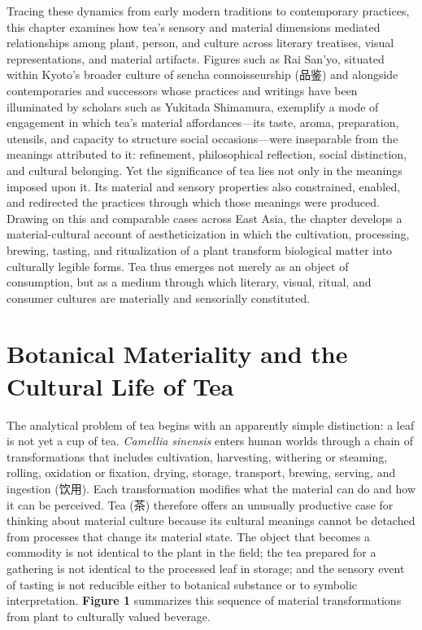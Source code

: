 \documentclass[numbers]{IntechOpen-Book}
\newcommand{\zh}[1]{{\CJKfontspec{Noto Serif CJK SC}\upshape #1}}
\begin{document}
Tracing these dynamics from early modern traditions to contemporary practices, this chapter examines how tea's sensory and material dimensions mediated relationships among plant, person, and culture across literary treatises, visual representations, and material artifacts. Figures such as Rai San'yo, situated within Kyoto's broader culture of sencha connoisseurship (\zh{品鉴}) and alongside contemporaries and successors whose practices and writings have been illuminated by scholars such as Yukitada Shimamura, exemplify a mode of engagement in which tea's material affordances---its taste, aroma, preparation, utensils, and capacity to structure social occasions---were inseparable from the meanings attributed to it: refinement, philosophical reflection, social distinction, and cultural belonging. Yet the significance of tea lies not only in the meanings imposed upon it. Its material and sensory properties also constrained, enabled, and redirected the practices through which those meanings were produced. Drawing on this and comparable cases across East Asia, the chapter develops a material-cultural account of aestheticization in which the cultivation, processing, brewing, tasting, and ritualization of a plant transform biological matter into culturally legible forms. Tea thus emerges not merely as an object of consumption, but as a medium through which literary, visual, ritual, and consumer cultures are materially and sensorially constituted.

\section{Botanical Materiality and the Cultural Life of Tea}

The analytical problem of tea begins with an apparently simple distinction: a leaf is not yet a cup of tea. \textit{Camellia sinensis} enters human worlds through a chain of transformations that includes cultivation, harvesting, withering or steaming, rolling, oxidation or fixation, drying, storage, transport, brewing, serving, and ingestion (\zh{饮用}). Each transformation modifies what the material can do and how it can be perceived. Tea (\zh{茶}) therefore offers an unusually productive case for thinking about material culture because its cultural meanings cannot be detached from processes that change its material state. The object that becomes a commodity is not identical to the plant in the field; the tea prepared for a gathering is not identical to the processed leaf in storage; and the sensory event of tasting is not reducible either to botanical substance or to symbolic interpretation. \textbf{Figure 1} summarizes this sequence of material transformations from plant to culturally valued beverage.
\end{document}
